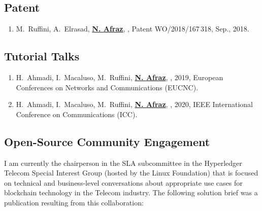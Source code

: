\subsection{Patent}
    \begin{enumerate}
    \item M.~Ruffini, A.~Elrasad, \textbf{\underline{N. {Afraz}}}, , Patent WO/2018/167\,318, Sep., 2018.
    \end{enumerate}
    
\subsection{Tutorial Talks}
\begin{enumerate}
    \item H.~Ahmadi, I.~Macaluso, M.~{Ruffini}, \textbf{\underline{N. {Afraz}}}, , 2019, European Conferences on Networks and Communications (EUCNC).
    
    \item H.~Ahmadi, I.~Macaluso, M.~{Ruffini}, \textbf{\underline{N. {Afraz}}}, , 2020, IEEE International Conference on Communications (ICC).\end{enumerate}
    
\subsection{Open-Source Community Engagement}
I am currently the chairperson in the \ac{SLA} subcommittee in the Hyperledger Telecom Special Interest Group (hosted by the Linux Foundation) that is focused on technical and business-level conversations about appropriate use cases for blockchain technology in the Telecom industry.  The following solution brief was a publication resulting from this collaboration:

